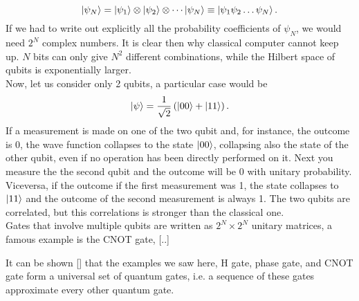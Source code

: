 \begin{equation}
\ket{\psi_N} = \ket{\psi_1}\otimes \ket{\psi_2}\otimes \cdots \ket{\psi_N} \equiv \ket{\psi_1\psi_2\dots \psi_N}.
\end{equation}
If we had to write out explicitly all the probability coefficients of $\psi_N$, we would need $2^N$ complex numbers. It is clear then why classical computer cannot keep up. $N$ bits can only give $N^2$ different combinations, while the Hilbert space of qubits is exponentially larger.\\
Now, let us consider only 2 qubits, a particular case would be
\begin{equation}
\ket{\psi} = \frac{1}{\sqrt{2}}\left(\ket{00} + \ket{11}\right).
\end{equation}
If a measurement is made on one of the two qubit and, for instance, the outcome is 0, the wave function collapses to the state $\ket{00}$, collapsing also the state of the other qubit, even if no operation has been directly performed on it. Next you measure the the second qubit and the outcome will be 0 with unitary probability. Viceversa, if the outcome if the first measurement was 1, the state collapses to $\ket{11}$ and the outcome of the second measurement is always 1. The two qubits are correlated, but this correlations is stronger than the classical one.\\
Gates that involve multiple qubits are written as $2^N\times 2^N$ unitary matrices, a famous example is the CNOT gate, [..]

It can be shown [] that the examples we saw here, H gate, phase gate, and CNOT gate form a universal set of quantum gates, i.e. a sequence of these gates approximate every other quantum gate.

